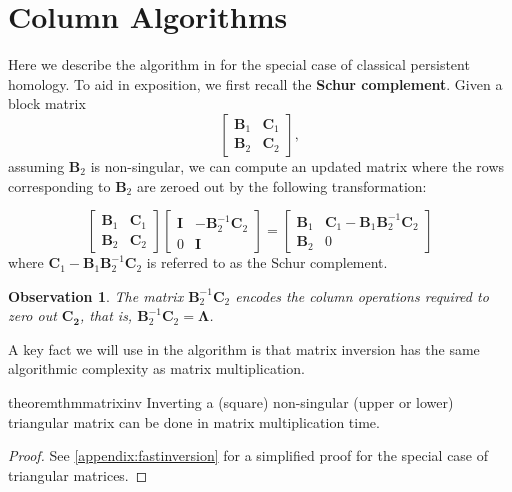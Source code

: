 \documentclass[10pt,a4paper]{article}
\newtheorem{observation}[theorem]{Observation}
\newcommand{\mat}[1]{\mathbf{#1}}
\begin{document}
\section{Column Algorithms}
Here we describe the algorithm in \cite{milosavljevic2011zigzag} for the special case of classical persistent homology. To aid in exposition, we first recall the \textbf{Schur complement}. Given a block matrix
\[
\begin{bmatrix}
    \mat{B}_1 & \mat{C}_1 \\
    \mat{B}_2 & \mat{C}_2
\end{bmatrix},\]
assuming $\mat{B}_2$ is non-singular, we can compute an updated matrix where the rows corresponding to $\mat{B}_2$ are zeroed out by the following transformation:

\begin{equation}\label{eq:schur}
	\begin{bmatrix}
        \mat{B}_1 & \mat{C}_1 \\
        \mat{B}_2 & \mat{C}_2
    \end{bmatrix}\begin{bmatrix} \mat{I}& -\mat{B}_2^{-1} \mat{C}_2 \\ 0 & \mat{I} \end{bmatrix} =  \begin{bmatrix} \mat{B}_1 & \mat{C}_1 - \mat{B}_1 \mat{B}^{-1}_2 \mat{C}_2 \\ \mat{B}_2& 0 \end{bmatrix}
\end{equation}
where $\mat{C}_1 - \mat{B}_1 \mat{B}^{-1}_2 \mat{C}_2$ is referred to as the Schur complement.

\begin{observation}
The matrix $\mat{B}_2^{-1}\mat{C}_2$ encodes the column operations required to zero out $\mat{C_2}$, that is, $\mat{B}_2^{-1}\mat{C}_2=\mat{\Lambda}$.
\end{observation}

A key fact we will use in the algorithm is that matrix inversion has the same algorithmic complexity as matrix multiplication. 
\begin{restatable}{theorem}{thmmatrixinv}
    \label{thm:matrix_inv}
    Inverting a (square) non-singular  (upper or lower) triangular matrix can be done in matrix multiplication time.
\end{restatable}
\begin{proof}
See \cref{appendix:fastinversion} for a simplified proof for the special case of triangular matrices.
\end{proof}
\end{document}
